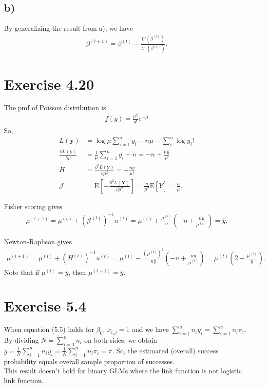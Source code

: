 \documentclass[a4paper]{article}
\newcommand{\E}{\mathrm{E}}
\begin{document}
\vspace{\baselineskip}
\subsection{b)}
By generalizing the result from a), we have
\begin{align*}
\beta^{(t+1)} = \beta^{(t)} - \frac{L'(\beta^{(t)})}{L''(\beta^{(t)})}.
\end{align*}


\vspace{\baselineskip}
\section{Exercise 4.20}
The pmf of Poisson distribution is
\begin{align*}
f(y) = \frac{\mu^{y}}{y!}e^{-\mu}
\end{align*}
So,
\begin{align*}
L(\bm{y}) &= \log\mu\sum_{i=1}^{n}y_{i} - n\mu -\sum_{i}^{n}\log y_{i}!\\
\frac{\partial L(\bm{y})}{\partial \mu} &= \frac{1}{\mu}\sum_{i=1}^{n}y_{i} -n = -n +\frac{n\overline{y}}{\mu}\\
H &= \frac{\partial^{2} L(\bm{y})}{\partial \mu^{2}} = -\frac{n\overline{y}}{\mu^{2}}\\
\mathcal{J} &= \E\left[-\frac{\partial^{2} L(\bm{Y})}{\partial \mu^{2}}\right] = \frac{n}{\mu^{2}}\E\left[\overline{Y}\right] = \frac{n}{\mu}.
\end{align*}

Fisher scoring gives
\begin{align*}
\mu^{(t+1)} = \mu^{(t)} + \left(\mathcal{J}^{(t)}\right)^{-1}u^{(t)} = \mu^{(t)} + \frac{\mu^{(t)}}{n}\left(-n +\frac{n\overline{y}}{\mu^{(t)}}\right) = \overline{y}.
\end{align*}

Newton-Raphson gives
\begin{align*}
\mu^{(t+1)} = \mu^{(t)} + \left(H^{(t)}\right)^{-1}u^{(t)} = \mu^{(t)} -\frac{\left(\mu^{(t)}\right)^{2}}{n\overline{y}}\left(-n +\frac{n\overline{y}}{\mu^{(t)}}\right) = \mu^{(t)}\left(2 - \frac{\mu^{(t)}}{\overline{y}}\right).
\end{align*}
Note that if $\mu^{(t)} = \overline{y}$, then $\mu^{(t+1)} = \overline{y}$.


\vspace{\baselineskip}
\section{Exercise 5.4}
When equation (5.5) holds for $\beta_{0}$, $x_{i,j} = 1$ and we have $\sum_{i=1}^{n} n_{i}y_{i} = \sum_{i=1}^{n} n_{i}\pi_{i}$. By dividing $N = \sum_{i=1}^{n} n_{i}$ on both sides, we obtain $\overline{y} = \frac{1}{N}\sum_{i=1}^{n} n_{i}y_{i} = \frac{1}{N}\sum_{i=1}^{n} n_{i}\pi_{i} = \pi$. So, the estimated (overall) success probability equals overall sample proportion of successes.\\
This result doesn't hold for binary GLMs where the link function is not logistic link function.
\end{document}
